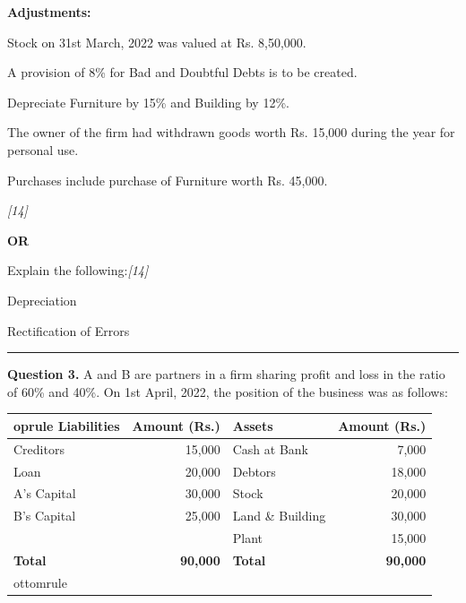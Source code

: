 \documentclass[11pt,a4paper]{article}
\newcommand{\pts}[1]{\hfill   \textit{[#1]}}
\begin{document}
\noindent   \textbf{Adjustments:}

\begin{parts}
  \item Stock on 31st March, 2022 was valued at Rs. 8,50,000.
  \item A provision of 8\% for Bad and Doubtful Debts is to be created.
  \item Depreciate Furniture by 15\% and Building by 12\%.
  \item The owner of the firm had withdrawn goods worth Rs. 15,000 during the year for personal use.
  \item Purchases include purchase of Furniture worth Rs. 45,000.
\end{parts}
\pts{14}

\centerline{   \textbf{OR}}

Explain the following:\pts{14}

\begin{parts}
  \item Depreciation
  \item Rectification of Errors
\end{parts}

\medskip\rule{\linewidth}{0.2pt}


\newpage




\noindent   \textbf{Question 3.}
A and B are partners in a firm sharing profit and loss in the ratio of 60\% and 40\%. On 1st April, 2022, the position of the business was as follows:

\begin{center}
  \small
  
\begin{tabular}{lr|lr}
     oprule
   \textbf{Liabilities} &   \textbf{Amount (Rs.)} &   \textbf{Assets} &   \textbf{Amount (Rs.)} \\
    \midrule
    Creditors & 15,000 & Cash at Bank & 7,000 \\
    Loan & 20,000 & Debtors & 18,000 \\
    A's Capital & 30,000 & Stock & 20,000 \\
    B's Capital & 25,000 & Land \& Building & 30,000 \\
              &        & Plant & 15,000 \\
    \midrule
   \textbf{Total} &   \textbf{90,000} &   \textbf{Total} &   \textbf{90,000} \\
    ottomrule
  \end{tabular}
\end{center}
\end{document}
